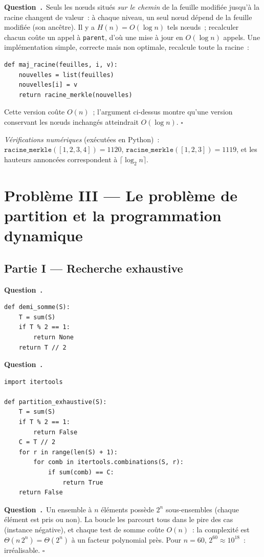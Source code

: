 \documentclass[11pt,a4paper]{article}
\newcounter{qcnt}
\newcommand{\Q}{\medskip\par\stepcounter{qcnt}\noindent\textbf{Question~\theqcnt.}~}
\newcommand{\code}[1]{\lstinline!#1!}
\begin{document}
\Q Seuls les n\oe uds situés \emph{sur le chemin} de la feuille modifiée jusqu'à la racine
changent de valeur~: à chaque niveau, un seul n\oe ud dépend de la feuille modifiée (son
ancêtre). Il y a $H(n)=O(\log n)$ tels n\oe uds~; recalculer chacun coûte un appel à \code{parent},
d'où une mise à jour en $O(\log n)$ appels. Une implémentation simple, correcte mais non
optimale, recalcule toute la racine~:
\begin{lstlisting}
def maj_racine(feuilles, i, v):
    nouvelles = list(feuilles)
    nouvelles[i] = v
    return racine_merkle(nouvelles)
\end{lstlisting}
Cette version coûte $O(n)$~; l'argument ci-dessus montre qu'une version conservant les n\oe uds
inchangés atteindrait $O(\log n)$. $\square$

\medskip
\noindent\emph{Vérifications numériques} (exécutées en Python)~: $\mathtt{racine\_merkle}([1,2,3,4])
=1120$, $\mathtt{racine\_merkle}([1,2,3])=1119$, et les hauteurs annoncées correspondent à
$\lceil\log_2 n\rceil$.

\clearpage
\section*{Problème III --- Le problème de partition et la programmation dynamique}
\subsection*{Partie I --- Recherche exhaustive}

\Q
\begin{lstlisting}
def demi_somme(S):
    T = sum(S)
    if T % 2 == 1:
        return None
    return T // 2
\end{lstlisting}

\Q
\begin{lstlisting}
import itertools

def partition_exhaustive(S):
    T = sum(S)
    if T % 2 == 1:
        return False
    C = T // 2
    for r in range(len(S) + 1):
        for comb in itertools.combinations(S, r):
            if sum(comb) == C:
                return True
    return False
\end{lstlisting}

\Q Un ensemble à $n$ éléments possède $2^{n}$ sous-ensembles (chaque élément est pris ou non).
La boucle les parcourt tous dans le pire des cas (instance négative), et chaque test de somme
coûte $O(n)$~: la complexité est $\Theta(n\,2^{n}) = \Theta(2^{n})$ à un facteur polynomial près.
Pour $n=60$, $2^{60}\approx 10^{18}$~: irréalisable. $\square$
\end{document}
